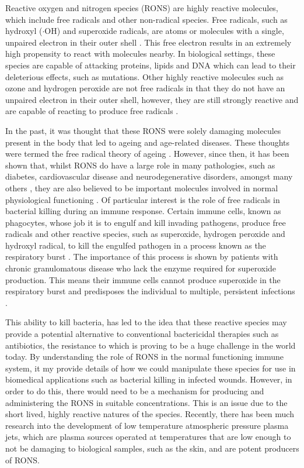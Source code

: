 \documentclass[11pt, oneside]{article}   	%
\begin{document}
Reactive oxygen and nitrogen species (RONS) are highly reactive molecules, which include free radicals and other non-radical species. 
Free radicals, such as hydroxyl ($\cdot$OH) and superoxide radicals, are atoms or molecules with a single, unpaired electron in their outer shell \cite{PhamHuy2008}. 
This free electron results in an extremely high propensity to react with molecules nearby. 
In biological settings, these species are capable of attacking proteins, lipids and DNA \cite{PhamHuy2008} which can lead to their deleterious effects, such as mutations.
Other highly reactive molecules such as ozone and hydrogen peroxide are not free radicals in that they do not have an unpaired electron in their outer shell, however, they are still strongly reactive and are capable of reacting to produce free radicals \cite{PhamHuy2008}.

In the past, it was thought that these RONS were solely damaging molecules present in the body that led to ageing and age-related diseases.
These thoughts were termed the free radical theory of ageing \cite{Harman1955}. 
However, since then, it has been shown that, whilst RONS do have a large role in many pathologies, such as diabetes, cardiovascular disease and neurodegenerative disorders, amongst many others \cite{Valko2007free, Floyd1999}, they are also believed to be important molecules involved in normal physiological functioning \cite{Ma2014}.
Of particular interest is the role of free radicals in bacterial killing during an immune response.
Certain immune cells, known as phagocytes, whose job it is to engulf and kill invading pathogens, produce free radicals and other reactive species, such as superoxide, hydrogen peroxide and hydroxyl radical, to kill the engulfed pathogen in a process known as the respiratory burst \cite{Janeway2011}.
The importance of this process is shown by patients with chronic granulomatous disease who lack the enzyme required for superoxide production. This means their immune cells cannot produce superoxide in the respiratory burst and predisposes the individual to multiple, persistent infections \cite{Janeway2011, Babior2004}.


This ability to kill bacteria, has led to the idea that these reactive species may provide a potential alternative to conventional bactericidal therapies such as antibiotics, the resistance to which is proving to be a huge challenge in the world today. 
By understanding the role of RONS in the normal functioning immune system, it my provide details of how we could manipulate these species for use in biomedical applications such as bacterial killing in infected wounds.
However, in order to do this, there would need to be a mechanism for producing and administering the RONS in suitable concentrations.
This is an issue due to the short lived, highly reactive natures of the species.
Recently, there has been much research into the development of low temperature atmospheric pressure plasma jets, which are plasma sources operated at temperatures that are low enough to not be damaging to biological samples, such as the skin, and are potent producers of RONS. 
\end{document}
